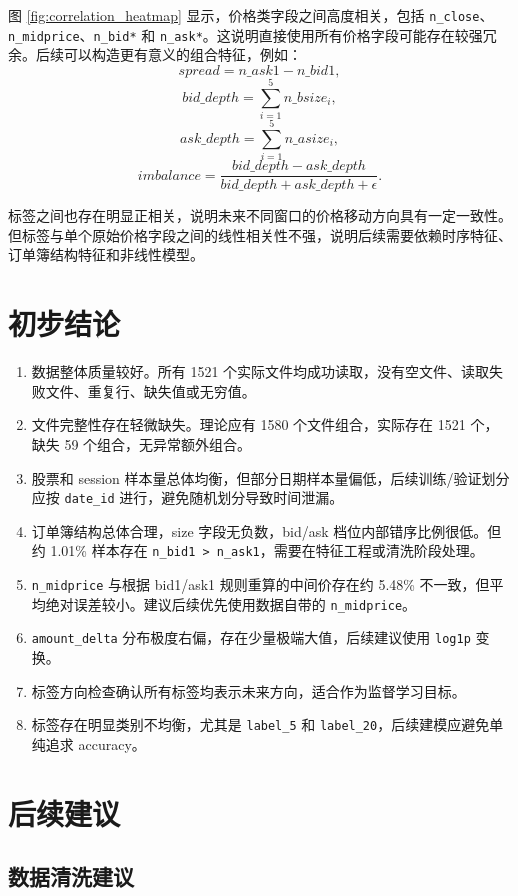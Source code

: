 \documentclass[UTF8,a4paper,12pt]{ctexart}
\begin{document}
图 \ref{fig:correlation_heatmap} 显示，价格类字段之间高度相关，包括 \texttt{n\_close}、\texttt{n\_midprice}、\texttt{n\_bid*} 和 \texttt{n\_ask*}。这说明直接使用所有价格字段可能存在较强冗余。后续可以构造更有意义的组合特征，例如：
\[
spread = n\_ask1 - n\_bid1,
\]
\[
bid\_depth = \sum_{i=1}^5 n\_bsize_i,
\]
\[
ask\_depth = \sum_{i=1}^5 n\_asize_i,
\]
\[
imbalance = \frac{bid\_depth - ask\_depth}{bid\_depth + ask\_depth + \epsilon}.
\]

标签之间也存在明显正相关，说明未来不同窗口的价格移动方向具有一定一致性。但标签与单个原始价格字段之间的线性相关性不强，说明后续需要依赖时序特征、订单簿结构特征和非线性模型。

\section{初步结论}

\begin{enumerate}
    \item 数据整体质量较好。所有 1521 个实际文件均成功读取，没有空文件、读取失败文件、重复行、缺失值或无穷值。
    \item 文件完整性存在轻微缺失。理论应有 1580 个文件组合，实际存在 1521 个，缺失 59 个组合，无异常额外组合。
    \item 股票和 session 样本量总体均衡，但部分日期样本量偏低，后续训练/验证划分应按 \texttt{date\_id} 进行，避免随机划分导致时间泄漏。
    \item 订单簿结构总体合理，size 字段无负数，bid/ask 档位内部错序比例很低。但约 1.01\% 样本存在 \texttt{n\_bid1 > n\_ask1}，需要在特征工程或清洗阶段处理。
    \item \texttt{n\_midprice} 与根据 bid1/ask1 规则重算的中间价存在约 5.48\% 不一致，但平均绝对误差较小。建议后续优先使用数据自带的 \texttt{n\_midprice}。
    \item \texttt{amount\_delta} 分布极度右偏，存在少量极端大值，后续建议使用 \texttt{log1p} 变换。
    \item 标签方向检查确认所有标签均表示未来方向，适合作为监督学习目标。
    \item 标签存在明显类别不均衡，尤其是 \texttt{label\_5} 和 \texttt{label\_20}，后续建模应避免单纯追求 accuracy。
\end{enumerate}

\section{后续建议}

\subsection{数据清洗建议}
\end{document}
